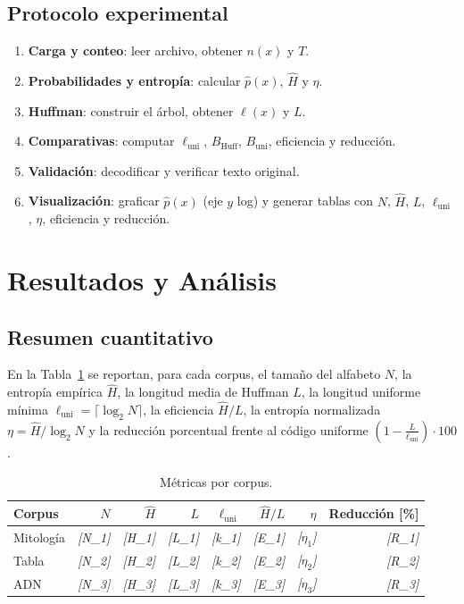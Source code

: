 \documentclass[12pt, a4paper]{article}
\begin{document}
\subsection*{Protocolo experimental}
\begin{enumerate}
  \item \textbf{Carga y conteo}: leer archivo, obtener $n(x)$ y $T$.
  \item \textbf{Probabilidades y entropía}: calcular $\hat p(x)$, $\hat H$ y $\eta$.
  \item \textbf{Huffman}: construir el árbol, obtener $\ell(x)$ y $L$.
  \item \textbf{Comparativas}: computar $\ell_{\text{uni}}$, $B_{\text{Huff}}$, $B_{\text{uni}}$, eficiencia y reducción.
  \item \textbf{Validación}: decodificar y verificar texto original.
  \item \textbf{Visualización}: graficar $\hat p(x)$ (eje $y$ log) y generar tablas con $N$, $\hat H$, $L$, $\ell_{\text{uni}}$, $\eta$, eficiencia y reducción.
\end{enumerate}

\section*{Resultados y Análisis}

\subsection*{Resumen cuantitativo}
En la Tabla~\ref{tab:metricas} se reportan, para cada corpus, el tamaño del alfabeto $N$, la entropía empírica $\hat H$, la longitud media de Huffman $L$, la longitud uniforme mínima $\ell_{\text{uni}}=\lceil\log_2 N\rceil$, la eficiencia $\hat H/L$, la entropía normalizada $\eta=\hat H/\log_2 N$ y la reducción porcentual frente al código uniforme $\left(1-\frac{L}{\ell_{\text{uni}}}\right)\cdot 100$.
%
\begin{table}[h!]
\centering
\caption{Métricas por corpus.}
\label{tab:metricas}
\begin{tabular}{lrrrrrrr}
\toprule
\textbf{Corpus} & $N$ & $\hat H$ & $L$ & $\ell_{\text{uni}}$ & $\hat H/L$ & $\eta$ & Reducción [\%] \\
\midrule
Mitología & \emph{[N\_1]} & \emph{[H\_1]} & \emph{[L\_1]} & \emph{[k\_1]} & \emph{[E\_1]} & \emph{[$\eta_1$]} & \emph{[R\_1]} \\
Tabla     & \emph{[N\_2]} & \emph{[H\_2]} & \emph{[L\_2]} & \emph{[k\_2]} & \emph{[E\_2]} & \emph{[$\eta_2$]} & \emph{[R\_2]} \\
ADN       & \emph{[N\_3]} & \emph{[H\_3]} & \emph{[L\_3]} & \emph{[k\_3]} & \emph{[E\_3]} & \emph{[$\eta_3$]} & \emph{[R\_3]} \\
\bottomrule
\end{tabular}
\end{table}
\end{document}
